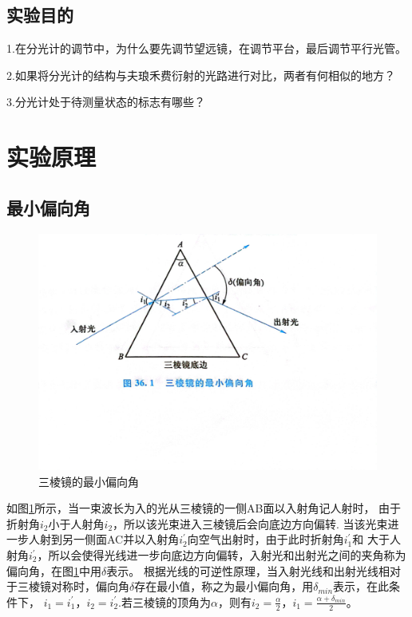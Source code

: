 \documentclass{ctexart}
\begin{document}
  \subsection{实验目的}
  1.\quad 在分光计的调节中，为什么要先调节望远镜，在调节平台，最后调节平行光管。

  2.\quad 如果将分光计的结构与夫琅禾费衍射的光路进行对比，两者有何相似的地方？
  
  3.\quad 分光计处于待测量状态的标志有哪些？

\section{实验原理}
  \subsection{最小偏向角}
  \begin{figure}[H]
    \centering
    \includegraphics[height=0.6\textwidth,width=1\textwidth]{zuixiaopianxiangjiao.jpg}
    \caption{三棱镜的最小偏向角}\label{zuixiaopianxiangjiao}
  \end{figure}
  如图\ref{zuixiaopianxiangjiao}所示，当一束波长为入的光从三棱镜的一侧AB面以入射角记人射时，
  由于折射角$i_{2}$小于人射角$i_{2}$，所以该光束进入三棱镜后会向底边方向偏转.
  当该光束进一步人射到另一侧面AC并以入射角${i}_{2}^{'}$向空气出射时，由于此时折射角${i}_{1}^{'}$和
  大于人射角$i_{2}^{'}$，所以会使得光线进一步向底边方向偏转，入射光和出射光之间的夹角称为偏向角，在图\ref{zuixiaopianxiangjiao}中用$\delta$表示。
  根据光线的可逆性原理，当入射光线和出射光线相对于三棱镜对称时，偏向角$\delta$存在最小值，称之为最小偏向角，用$\delta_{min}$表示，在此条件下，
  $i_{1}=i_{1}^{'}$，$i_{2}=i_{2}^{'}$.若三棱镜的顶角为$\alpha$，则有$i_{2}=\frac{\alpha}{2}$，$i_{1}=\frac{\alpha + \delta_{min}}{2}$。
  
\end{document}
